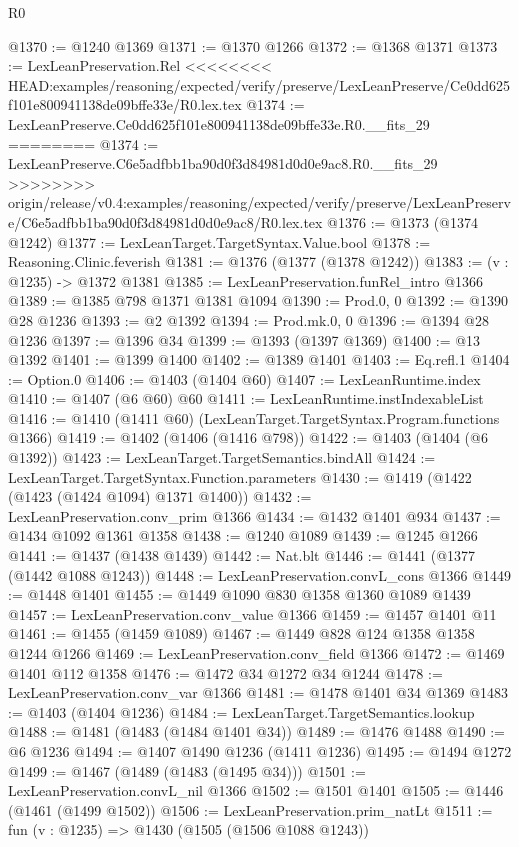 \begin{lexlean}{R0}
\begin{coremodule}
{{{{{{{{{{{{{{{{{{{{{{{{{{{{{{{{{{{{{{{{{{{{{{{{{{{{{{{{{{{{{{{{{{{{{{{{{{{{{{{{{{{{{{@1370 := @1240 @1369
@1371 := @1370 @1266
@1372 := @1368 @1371
@1373 := LexLeanPreservation.Rel
<<<<<<<< HEAD:examples/reasoning/expected/verify/preserve/LexLeanPreserve/Ce0dd625f101e800941138de09bffe33e/R0.lex.tex
@1374 := LexLeanPreserve.Ce0dd625f101e800941138de09bffe33e.R0.__fits_29
========
@1374 := LexLeanPreserve.C6e5adfbb1ba90d0f3d84981d0d0e9ac8.R0.__fits_29
>>>>>>>> origin/release/v0.4:examples/reasoning/expected/verify/preserve/LexLeanPreserve/C6e5adfbb1ba90d0f3d84981d0d0e9ac8/R0.lex.tex
@1376 := @1373 (@1374 @1242)
@1377 := LexLeanTarget.TargetSyntax.Value.bool
@1378 := Reasoning.Clinic.feverish
@1381 := @1376 (@1377 (@1378 @1242))
@1383 := (v : @1235) -> @1372 @1381
@1385 := LexLeanPreservation.funRel_intro @1366
@1389 := @1385 @798 @1371 @1381 @1094
@1390 := Prod.{0, 0}
@1392 := @1390 @28 @1236
@1393 := @2 @1392
@1394 := Prod.mk.{0, 0}
@1396 := @1394 @28 @1236
@1397 := @1396 @34
@1399 := @1393 (@1397 @1369)
@1400 := @13 @1392
@1401 := @1399 @1400
@1402 := @1389 @1401
@1403 := Eq.refl.{1}
@1404 := Option.{0}
@1406 := @1403 (@1404 @60)
@1407 := LexLeanRuntime.index
@1410 := @1407 (@6 @60) @60
@1411 := LexLeanRuntime.instIndexableList
@1416 := @1410 (@1411 @60) (LexLeanTarget.TargetSyntax.Program.functions @1366)
@1419 := @1402 (@1406 (@1416 @798))
@1422 := @1403 (@1404 (@6 @1392))
@1423 := LexLeanTarget.TargetSemantics.bindAll
@1424 := LexLeanTarget.TargetSyntax.Function.parameters
@1430 := @1419 (@1422 (@1423 (@1424 @1094) @1371 @1400))
@1432 := LexLeanPreservation.conv_prim @1366
@1434 := @1432 @1401 @934
@1437 := @1434 @1092 @1361 @1358
@1438 := @1240 @1089
@1439 := @1245 @1266
@1441 := @1437 (@1438 @1439)
@1442 := Nat.blt
@1446 := @1441 (@1377 (@1442 @1088 @1243))
@1448 := LexLeanPreservation.convL_cons @1366
@1449 := @1448 @1401
@1455 := @1449 @1090 @830 @1358 @1360 @1089 @1439
@1457 := LexLeanPreservation.conv_value @1366
@1459 := @1457 @1401 @11
@1461 := @1455 (@1459 @1089)
@1467 := @1449 @828 @124 @1358 @1358 @1244 @1266
@1469 := LexLeanPreservation.conv_field @1366
@1472 := @1469 @1401 @112 @1358
@1476 := @1472 @34 @1272 @34 @1244
@1478 := LexLeanPreservation.conv_var @1366
@1481 := @1478 @1401 @34 @1369
@1483 := @1403 (@1404 @1236)
@1484 := LexLeanTarget.TargetSemantics.lookup
@1488 := @1481 (@1483 (@1484 @1401 @34))
@1489 := @1476 @1488
@1490 := @6 @1236
@1494 := @1407 @1490 @1236 (@1411 @1236)
@1495 := @1494 @1272
@1499 := @1467 (@1489 (@1483 (@1495 @34)))
@1501 := LexLeanPreservation.convL_nil @1366
@1502 := @1501 @1401
@1505 := @1446 (@1461 (@1499 @1502))
@1506 := LexLeanPreservation.prim_natLt
@1511 := fun (v : @1235) => @1430 (@1505 (@1506 @1088 @1243))
}}}}}}}}}}}}}}}}}}}}}}}}}}}}}}}}}}}}}}}}}}}}}}}}}}}}}}}}}}}}}}}}}}}}}}}}}}}}}}}}}}}}}}
\end{coremodule}
\end{lexlean}
